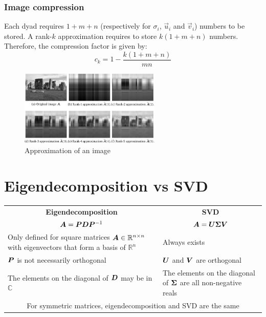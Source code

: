 \subsubsection{Image compression}
Each dyad requires $1 + m + n$ (respectively for $\sigma_i$, $\vec{u}_i$ and $\vec{v}_i$) numbers to be stored.
A rank-$k$ approximation requires to store $k(1 + m + n)$ numbers.
Therefore, the compression factor is given by: 
\[
    c_k = 1 - \frac{k(1 + m + n)}{mn}
\]

\begin{figure}[h]
    \centering
    \includegraphics[width=0.60\textwidth]{img/_rank_k_approx.pdf}
    \caption{Approximation of an image}
\end{figure}



\section{Eigendecomposition vs SVD}
\begin{center}
    \begin{tabular}{m{16em} | m{16em}}
        \hline
        \multicolumn{1}{c|}{\textbf{Eigendecomposition}} & \multicolumn{1}{c}{\textbf{SVD}} \\
        \multicolumn{1}{c|}{${\bm{A}} = {\bm{P}}{\bm{D}}{\bm{P}}^{-1}$} & \multicolumn{1}{c}{${\bm{A}}={\bm{U}}{\bm{\Sigma}}{\bm{V}}$} \\
        \hline
        Only defined for square matrices ${\bm{A}} \in \mathbb{R}^{n \times n}$ with eigenvectors that form a basis of $\mathbb{R}^n$ 
        & Always exists \\
        \hline
        ${\bm{P}}$ is not necessarily orthogonal & ${\bm{U}}$ and ${\bm{V}}$ are orthogonal \\
        \hline
        The elements on the diagonal of ${\bm{D}}$ may be in $\mathbb{C}$ 
        & The elements on the diagonal of ${\bm{\Sigma}}$ are all non-negative reals \\
        \hline
        \multicolumn{2}{c}{For symmetric matrices, eigendecomposition and SVD are the same} \\
        \hline
    \end{tabular}
\end{center}
